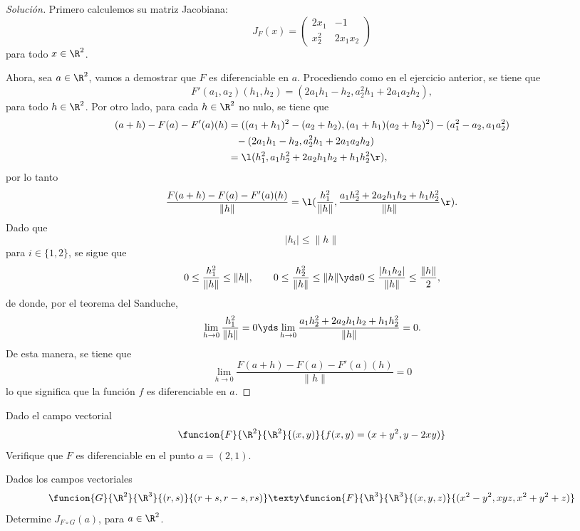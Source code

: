 \documentclass[a4,11pt]{aleph-notas}
\begin{document}
\begin{proof}[Solución]
Primero calculemos su matriz Jacobiana:
	\[
		J_F(x)=
		\begin{pmatrix}
			2x_1&-1\\
			x_2^2&2x_1x_2
		\end{pmatrix}
	\]
	para todo $x\in\R^2$.
    
    Ahora, sea $a\in\R^2$, vamos a demostrar que $F$ es diferenciable en $a$. Procediendo como en el ejercicio anterior, se tiene que
    \[
        F'(a_1,a_2)(h_1,h_2)=(2a_1h_1-h_2, a_2^2h_1+2a_1a_2h_2),
    \]
    para todo $h\in\R^2$. Por otro lado, para cada $h\in\R^2$ no nulo, se tiene que
	\begin{align*}
		(a+h)-F(a)-F'(a)(h)
			&=((a_1+h_1)^2-(a_2+h_2),(a_1+h_1)(a_2+h_2)^2)
			-(a_1^2-a_2,a_1 a_2^2) \\
			&\phantom{=}-(2a_1h_1-h_2, a_2^2h_1+2a_1a_2h_2) \\
			&=\l(h_1^2, a_1h_2^2+2a_2h_1h_2+h_1h_2^2\r),
	\end{align*}
	por lo tanto
	\[
	    \frac{F(a+h)-F(a)-F'(a)(h)}{\|h\|}=\l(\frac{h_1^2}{\|h\|},\frac{a_1h_2^2+2a_2h_1h_2+h_1h_2^2}{\|h\|}\r).
	\]
	Dado que
	\[
		|h_i|\leq \|h\|
	\]
	para $i\in\{1, 2\}$, se sigue que
	\[
		0\leq \dfrac{h_1^2}{\|h\|}\leq \|h\|, 
		\qquad
		0\leq \dfrac{h_2^2}{\|h\|}\leq \|h\|
		\yds
		0\leq \dfrac{|h_1h_2|}{\|h\|}\leq \frac{\|h\|}{2}, 
	\]
	de donde, por el teorema del Sanduche, 
	\[
		\lim_{h\to 0}\dfrac{h_1^2}{\|h\|}=0
		\yds
		\lim_{h\to 0}\dfrac{a_1h_2^2+2 a_2h_1h_2+h_1h_2^2}{\|h\|}=0.
	\]
	De esta manera, se tiene que
	\[
		\lim_{h\to 0}\dfrac{F(a+h)-F(a)-F'(a)(h)}{\|h\|}=0
	\]
	lo que significa que la función $f$ es diferenciable en $a$.
\end{proof}

\begin{ejer}
Dado el campo vectorial
    \[
        \funcion{F}{\R^2}{\R^2}{(x,y)}{f(x,y)=(x+y^2,y-2xy)}
    \]
    Verifique que $F$ es diferenciable en el punto $a=(2,1)$.
\end{ejer}

\begin{ejer}
Dados los campos vectoriales
	\[
 	    \funcion{G}{\R^2}{\R^3}{(r,s)}{(r+s,r-s,rs)}
 	    \texty
 	    \funcion{F}{\R^3}{\R^3}{(x,y,z)}{(x^2-y^2,xyz,x^2+y^2+z)}
	\]
	Determine $J_{F\circ G}(a)$, para $a\in\R^2$.
\end{ejer}
\end{document}
